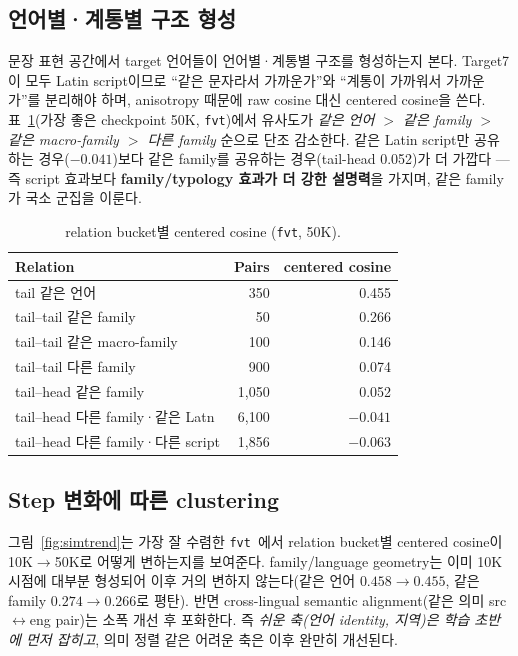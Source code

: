 \documentclass[11pt,a4paper]{article}
\newcommand{\fvt}{\texttt{fvt}}
\begin{document}
\subsection{언어별·계통별 구조 형성}
문장 표현 공간에서 target 언어들이 언어별·계통별 구조를 형성하는지 본다. Target7이 모두 Latin script이므로 ``같은 문자라서 가까운가''와 ``계통이 가까워서 가까운가''를 분리해야 하며, anisotropy 때문에 raw cosine 대신 centered cosine을 쓴다. 표~\ref{tab:geo}(가장 좋은 checkpoint 50K, \fvt)에서 유사도가 \emph{같은 언어 $>$ 같은 family $>$ 같은 macro-family $>$ 다른 family} 순으로 단조 감소한다. 같은 Latin script만 공유하는 경우($-0.041$)보다 같은 family를 공유하는 경우(tail-head 0.052)가 더 가깝다 --- 즉 script 효과보다 \textbf{family/typology 효과가 더 강한 설명력}을 가지며, 같은 family가 국소 군집을 이룬다.

\begin{table}[h]\centering\small
\caption{relation bucket별 centered cosine (\fvt, 50K).}
\label{tab:geo}
\begin{tabular}{@{}lrr@{}}
\toprule
Relation & Pairs & centered cosine \\
\midrule
tail 같은 언어 & 350 & 0.455 \\
tail--tail 같은 family & 50 & 0.266 \\
tail--tail 같은 macro-family & 100 & 0.146 \\
tail--tail 다른 family & 900 & 0.074 \\
tail--head 같은 family & 1{,}050 & 0.052 \\
tail--head 다른 family·같은 Latn & 6{,}100 & $-0.041$ \\
tail--head 다른 family·다른 script & 1{,}856 & $-0.063$ \\
\bottomrule
\end{tabular}
\end{table}

\subsection{Step 변화에 따른 clustering}
그림~\ref{fig:simtrend}는 가장 잘 수렴한 \fvt\ 에서 relation bucket별 centered cosine이 10K$\to$50K로 어떻게 변하는지를 보여준다. family/language geometry는 이미 10K 시점에 대부분 형성되어 이후 거의 변하지 않는다(같은 언어 $0.458\to0.455$, 같은 family $0.274\to0.266$로 평탄). 반면 cross-lingual semantic alignment(같은 의미 src$\leftrightarrow$eng pair)는 소폭 개선 후 포화한다. 즉 \emph{쉬운 축(언어 identity, 지역)은 학습 초반에 먼저 잡히고}, 의미 정렬 같은 어려운 축은 이후 완만히 개선된다.
\end{document}
